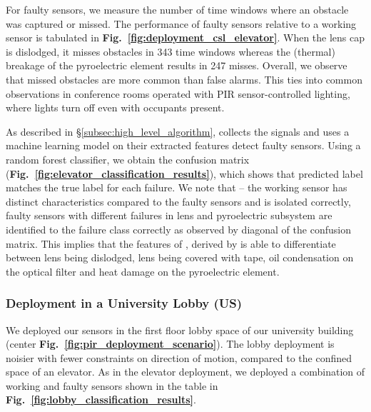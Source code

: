 For faulty sensors, we measure the number of time windows where an obstacle was captured or missed. 
The performance of faulty sensors relative to a working sensor is tabulated in {\bfseries Fig.~\ref{fig:deployment_csl_elevator}}. 
When the lens cap is dislodged, it misses obstacles in 343 time windows whereas the (thermal) breakage of the pyroelectric element results in 247 misses. 
Overall, we observe that missed obstacles are more common than false alarms.
This ties into common observations in conference rooms operated with PIR sensor-controlled lighting, where lights turn off even with occupants present.


As described in \S\ref{subsec:high_level_algorithm}, \sol collects the \aout signals and uses a machine learning model on their extracted features detect faulty sensors. %
Using a random forest classifier, we obtain the confusion matrix ({\bfseries Fig.~\ref{fig:elevator_classification_results}}), which shows that predicted label matches the true label for each failure. 
We note that -- \ca the working sensor has distinct characteristics compared to the faulty sensors and is isolated correctly, \cb faulty sensors with different failures in lens and pyroelectric subsystem are identified to the failure class correctly as observed by diagonal of the confusion matrix. This implies that the %
features of \aout, derived by \sol is able to differentiate between lens being dislodged, lens being covered with tape, oil condensation on the optical filter and heat damage on the pyroelectric element.



\subsubsection{Deployment in a University Lobby (US)}\label{subsubsec:lobby} We deployed our sensors %
in the first floor lobby space of our university building (center {\bfseries Fig.~\ref{fig:pir_deployment_scenario}}). The lobby deployment is noisier with fewer constraints on direction of motion, compared to the confined space of an elevator. As in the elevator deployment, we deployed a combination of working and faulty sensors shown in the table in {\bfseries Fig.~\ref{fig:lobby_classification_results}}.


